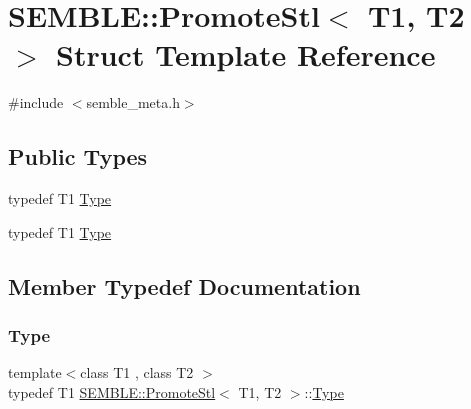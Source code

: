 \hypertarget{structSEMBLE_1_1PromoteStl}{}\section{S\+E\+M\+B\+LE\+:\+:Promote\+Stl$<$ T1, T2 $>$ Struct Template Reference}
\label{structSEMBLE_1_1PromoteStl}


{\ttfamily \#include $<$semble\+\_\+meta.\+h$>$}

\subsection*{Public Types}
\begin{DoxyCompactItemize}
\item 
typedef T1 \mbox{\hyperlink{structSEMBLE_1_1PromoteStl_a477c81c75d18734d5e76d794d0aba83c}{Type}}
\item 
typedef T1 \mbox{\hyperlink{structSEMBLE_1_1PromoteStl_a477c81c75d18734d5e76d794d0aba83c}{Type}}
\end{DoxyCompactItemize}


\subsection{Member Typedef Documentation}
\mbox{\label{structSEMBLE_1_1PromoteStl_a477c81c75d18734d5e76d794d0aba83c}} 
\subsubsection{\texorpdfstring{Type}{Type}\hspace{0.1cm}{\footnotesize\ttfamily [1/2]}}
{\footnotesize\ttfamily template$<$class T1 , class T2 $>$ \\
typedef T1 \mbox{\hyperlink{structSEMBLE_1_1PromoteStl}{S\+E\+M\+B\+L\+E\+::\+Promote\+Stl}}$<$ T1, T2 $>$\+::\mbox{\hyperlink{structSEMBLE_1_1PromoteStl_a477c81c75d18734d5e76d794d0aba83c}{Type}}}

\mbox{\label{structSEMBLE_1_1PromoteStl_a477c81c75d18734d5e76d794d0aba83c}} 
